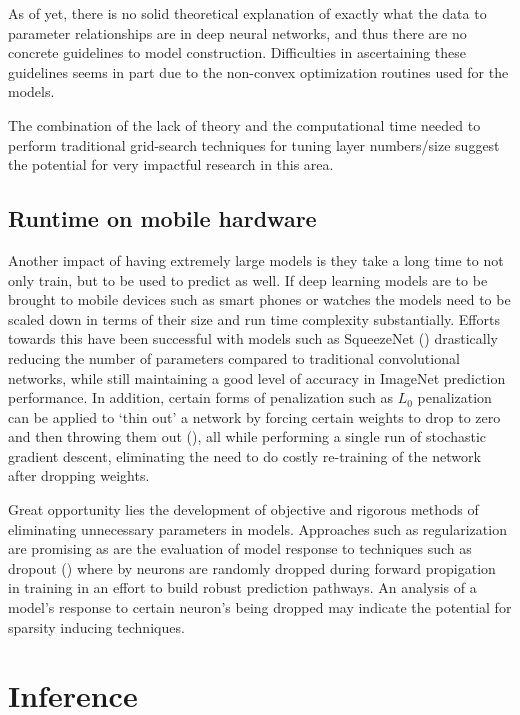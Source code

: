 \documentclass[]{book}
\theoremstyle{definition}
\theoremstyle{definition}
\theoremstyle{definition}
\theoremstyle{remark}
\begin{document}
As of yet, there is no solid theoretical explanation of exactly what the
data to parameter relationships are in deep neural networks, and thus
there are no concrete guidelines to model construction. Difficulties in
ascertaining these guidelines seems in part due to the non-convex
optimization routines used for the models.

The combination of the lack of theory and the computational time needed
to perform traditional grid-search techniques for tuning layer
numbers/size suggest the potential for very impactful research in this
area.

\subsection{Runtime on mobile
hardware}\label{runtime-on-mobile-hardware}

Another impact of having extremely large models is they take a long time
to not only train, but to be used to predict as well. If deep learning
models are to be brought to mobile devices such as smart phones or
watches the models need to be scaled down in terms of their size and run
time complexity substantially. Efforts towards this have been successful
with models such as SqueezeNet (\citet{squeezenet}) drastically reducing
the number of parameters compared to traditional convolutional networks,
while still maintaining a good level of accuracy in ImageNet prediction
performance. In addition, certain forms of penalization such as \(L_0\)
penalization can be applied to `thin out' a network by forcing certain
weights to drop to zero and then throwing them out (\citet{sparsenets}),
all while performing a single run of stochastic gradient descent,
eliminating the need to do costly re-training of the network after
dropping weights.

Great opportunity lies the development of objective and rigorous methods
of eliminating unnecessary parameters in models. Approaches such as
regularization are promising as are the evaluation of model response to
techniques such as dropout (\citet{dropout}) where by neurons are
randomly dropped during forward propigation in training in an effort to
build robust prediction pathways. An analysis of a model's response to
certain neuron's being dropped may indicate the potential for sparsity
inducing techniques.

\section{Inference}\label{inference}
\end{document}
